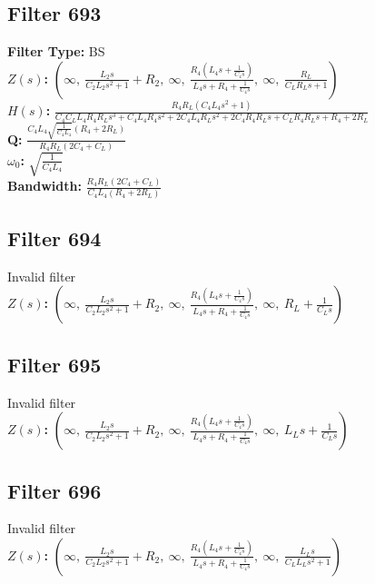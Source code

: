 \documentclass{article}
\begin{document}
\subsection*{Filter 693}
\textbf{Filter Type:} BS \\ 
\textbf{$Z(s)$:} $\left( \infty, \  \frac{L_{2} s}{C_{2} L_{2} s^{2} + 1} + R_{2}, \  \infty, \  \frac{R_{4} \left(L_{4} s + \frac{1}{C_{4} s}\right)}{L_{4} s + R_{4} + \frac{1}{C_{4} s}}, \  \infty, \  \frac{R_{L}}{C_{L} R_{L} s + 1}\right)$ \\ 
\textbf{$H(s)$:} $\frac{R_{4} R_{L} \left(C_{4} L_{4} s^{2} + 1\right)}{C_{4} C_{L} L_{4} R_{4} R_{L} s^{3} + C_{4} L_{4} R_{4} s^{2} + 2 C_{4} L_{4} R_{L} s^{2} + 2 C_{4} R_{4} R_{L} s + C_{L} R_{4} R_{L} s + R_{4} + 2 R_{L}}$ \\ 
\textbf{Q:} $\frac{C_{4} L_{4} \sqrt{\frac{1}{C_{4} L_{4}}} \left(R_{4} + 2 R_{L}\right)}{R_{4} R_{L} \left(2 C_{4} + C_{L}\right)}$ \\ 
\textbf{$\omega_0$:} $\sqrt{\frac{1}{C_{4} L_{4}}}$ \\ 
\textbf{Bandwidth:} $\frac{R_{4} R_{L} \left(2 C_{4} + C_{L}\right)}{C_{4} L_{4} \left(R_{4} + 2 R_{L}\right)}$ \\ 
\subsection*{Filter 694}
Invalid filter \\ 
\textbf{$Z(s)$:} $\left( \infty, \  \frac{L_{2} s}{C_{2} L_{2} s^{2} + 1} + R_{2}, \  \infty, \  \frac{R_{4} \left(L_{4} s + \frac{1}{C_{4} s}\right)}{L_{4} s + R_{4} + \frac{1}{C_{4} s}}, \  \infty, \  R_{L} + \frac{1}{C_{L} s}\right)$ \\ 
\subsection*{Filter 695}
Invalid filter \\ 
\textbf{$Z(s)$:} $\left( \infty, \  \frac{L_{2} s}{C_{2} L_{2} s^{2} + 1} + R_{2}, \  \infty, \  \frac{R_{4} \left(L_{4} s + \frac{1}{C_{4} s}\right)}{L_{4} s + R_{4} + \frac{1}{C_{4} s}}, \  \infty, \  L_{L} s + \frac{1}{C_{L} s}\right)$ \\ 
\subsection*{Filter 696}
Invalid filter \\ 
\textbf{$Z(s)$:} $\left( \infty, \  \frac{L_{2} s}{C_{2} L_{2} s^{2} + 1} + R_{2}, \  \infty, \  \frac{R_{4} \left(L_{4} s + \frac{1}{C_{4} s}\right)}{L_{4} s + R_{4} + \frac{1}{C_{4} s}}, \  \infty, \  \frac{L_{L} s}{C_{L} L_{L} s^{2} + 1}\right)$ \\ 
\end{document}
